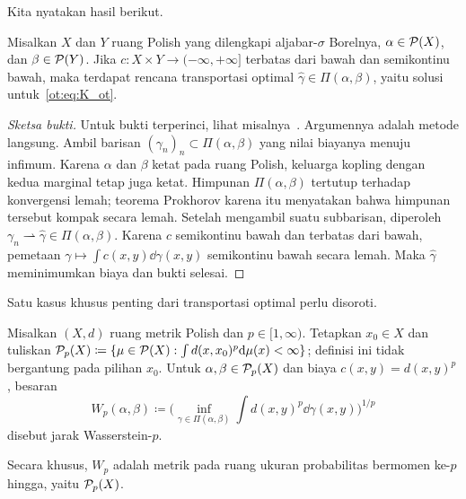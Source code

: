 Kita nyatakan hasil berikut.
\begin{theorem}
    Misalkan $X$ dan $Y$ ruang Polish yang dilengkapi aljabar-$\sigma$ Borelnya, $\alpha\in\mathcal{P}(X)$, dan $\beta\in\mathcal{P}(Y)$. Jika $c:X\times Y\rightarrow(-\infty,+\infty]$ terbatas dari bawah dan semikontinu bawah, maka terdapat rencana transportasi optimal $\hat\gamma\in\Pi(\alpha,\beta)$, yaitu solusi untuk~\eqref{ot:eq:K_ot}.
\end{theorem}
\begin{proof}[Sketsa bukti]
    Untuk bukti terperinci, lihat misalnya~\cite[Theorem 4.1]{villani2009optimal}. Argumennya adalah metode langsung. Ambil barisan $(\gamma_n)_n\subset\Pi(\alpha,\beta)$ yang nilai biayanya menuju infimum. Karena $\alpha$ dan $\beta$ ketat pada ruang Polish, keluarga kopling dengan kedua marginal tetap juga ketat. Himpunan $\Pi(\alpha,\beta)$ tertutup terhadap konvergensi lemah; teorema Prokhorov karena itu menyatakan bahwa himpunan tersebut kompak secara lemah. Setelah mengambil suatu subbarisan, diperoleh $\gamma_n\rightharpoonup\hat\gamma\in\Pi(\alpha,\beta)$. Karena $c$ semikontinu bawah dan terbatas dari bawah, pemetaan $\gamma\mapsto\int c(x,y)\dd\gamma(x,y)$ semikontinu bawah secara lemah. Maka $\hat\gamma$ meminimumkan biaya dan bukti selesai.
\end{proof}

Satu kasus khusus penting dari transportasi optimal perlu disoroti.

\begin{defn}
Misalkan $(X,d)$ ruang metrik Polish dan $p\in[1,\infty)$. Tetapkan $x_0\in X$ dan tuliskan
$\mathcal{P}_p(X)\coloneqq\{\mu\in\mathcal{P}(X):\int d(x,x_0)^p\mathrm{d}\mu(x)<\infty\}$; definisi ini tidak bergantung pada pilihan $x_0$. Untuk $\alpha,\beta\in\mathcal{P}_p(X)$ dan biaya $c(x,y)=d(x,y)^p$, besaran
\begin{equation}
    W_p(\alpha,\beta)\coloneqq
    \bigg(\inf_{\gamma\in\Pi(\alpha,\beta)}
    \int d(x,y)^p\dd\gamma(x,y)\bigg)^{1/p}
\end{equation}
disebut jarak Wasserstein-$p$.
\end{defn}
Secara khusus, $W_p$ adalah metrik pada ruang ukuran probabilitas bermomen ke-$p$ hingga, yaitu $\mathcal{P}_p(X)$.

